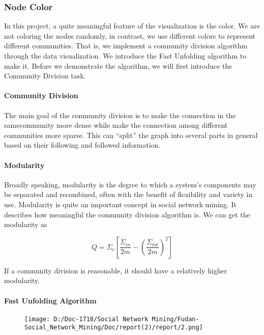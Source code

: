 \documentclass[]{article}
\let\oldparagraph\paragraph
\renewcommand{\paragraph}[1]{\oldparagraph{#1}\mbox{}}
\begin{document}
\hypertarget{header-n16}{%
\subsubsection{Node Color}\label{header-n16}}

In this project, a quite meaningful feature of the visualization is the
color. We are not coloring the nodes randomly, in contrast, we use
different colors to represent different communities. That is, we
implement a community division algorithm through the data visualization.
We introduce the Fast Unfolding algorithm to make it. Before we
demonstrate the algorithm, we will first introduce the Community
Division task.

\hypertarget{header-n19}{%
\paragraph{Community Division}\label{header-n19}}

The main goal of the community division is to make the connection in the
samecommunity more dense while make the connection among different
communities more sparse. This can ``split'' the graph into several parts
in general based on their following and followed information.\\

\hypertarget{header-n22}{%
\paragraph{Modularity}\label{header-n22}}

Broadly speaking, modularity is the degree to which a system's
components may be separated and recombined, often with the benefit of
flexibility and variety in use. Modularity is quite an important concept
in social network mining. It describes how meaningful the community
division algorithm is. We can get the modularity as

\[Q =Σ_c  [ \frac{Σ_{in}}{2m}−(\frac{Σ_{tot}}{2m})^2]\]

If a community division is reasonable, it should have a relatively
higher modularity.

\hypertarget{header-n28}{%
\paragraph{Fast Unfolding Algorithm}\label{header-n28}}

\begin{figure}
\centering
\texttt{[image: D:/Doc-1718/Social Network Mining/Fudan-Social\_Network\_Mining/Doc/report(2)/report/2.png]}
\caption{}
\end{figure}
\end{document}
